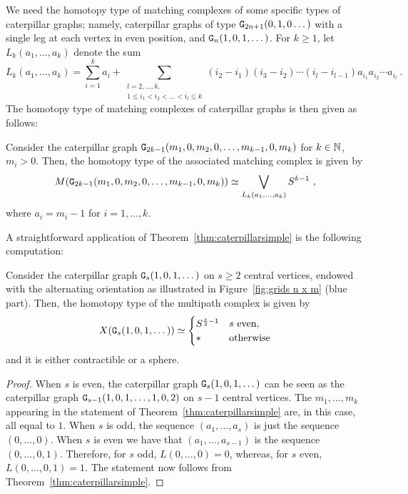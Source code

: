 \documentclass{amsart}
\newcommand{\CC}[1]{\textcolor{princetonorange}{#1}}
\begin{document}
We need the homotopy type of matching complexes of some specific types of caterpillar graphs; namely, caterpillar graphs of type ${\tt G}_{2n+1}(0,1,0\dots)$ with a single leg at each vertex in even position, and ${\tt G}_n(1,0,1,\dots)$.
For $k\geq 1$, let $L_k(a_1,\dots,a_k)$ denote the sum
\[
L_k(a_1,\dots,a_k) = \sum_{i=1}^{k} a_i + \sum_{\substack{l=2,\dots, k, \\ 1\leq i_1<i_2<\dots<i_l\leq k}} (i_2-i_1)(i_3-i_2)\cdots(i_l-i_{l-1})a_{i_1}a_{i_2}\cdots a_{i_l} \ .
\]
The homotopy type of matching complexes of caterpillar graphs is then given as follows:



\begin{thm}\label{thm:caterpillarsimple}
Consider the caterpillar graph ${\tt G}_{2k-1}(m_1,0,m_2,0,\dots,m_{k-1},0,m_{k})$ for $k\in\mathbb N$, $m_i >0$. Then, the homotopy type of the associated matching complex is given by
\[
M({\tt G}_{2k-1}(m_1,0,m_2,0,\dots,m_{k-1},0,m_{k}))\simeq \bigvee_{L_k(a_1,\dots,a_k)}S^{k-1} \ ,
\]
where $a_i=m_i-1$ for $i=1,\dots,k$.
\end{thm}

A straightforward application of Theorem~\ref{thm:caterpillarsimple} is the following computation:

\begin{lem}\label{lem:catalt}
Consider the caterpillar graph ${\tt G}_{s}(1,0,1,\dots)$ on $s\geq 2$ central vertices, endowed with the alternating orientation as illustrated in Figure~\ref{fig:grids n x m} (blue part). Then, the homotopy type of the multipath complex is given by
\[ X({\tt G}_{s}(1,0,1,\dots)) \simeq \begin{cases}
S^{\frac{s}{2}-1} & s \text{ even}, \\
\ast &\text{otherwise}
\end{cases}\]
and it is either contractible or a sphere.
\end{lem}

\begin{proof}
When $s$ is even, the caterpillar graph ${\tt G}_s(1,0,1,\dots)$ can be seen as the caterpillar graph ${\tt G}_{s-1}(1,0,1,\dots,1,0,2)$ on $s-1$ central vertices. The $m_1,\dots,m_k$ appearing in the statement of Theorem~\ref{thm:caterpillarsimple} are, in this case, all equal to $1$. When $s$ is odd, the sequence $(a_1,\dots,a_{s})$ is just the sequence $(0,\dots,0)$. When $s$ is even we have that $(a_1,\dots,a_{s-1})$ is the sequence $(0,\dots,0,1)$. Therefore, for $s$ odd, $L(0,\dots,0)=0$, whereas, for $s$ even, $L(0,\dots,0,1)=1$. The statement now follows from Theorem~\ref{thm:caterpillarsimple}.
\end{proof}
\end{document}
